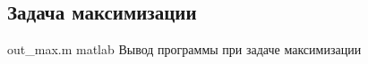 


\subsection{Задача максимизации}

    {out_max.m} %
    {matlab} %
    {Вывод программы при задаче максимизации} %






